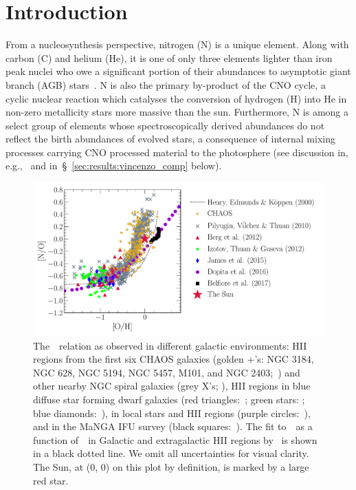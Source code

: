 \documentclass[ms.tex]{subfiles}
\begin{document}
\section{Introduction}
\label{sec:intro}

From a nucleosynthesis perspective, nitrogen (N) is a unique element.
Along with carbon (C) and helium (He), it is one of only three elements lighter
than iron peak nuclei who owe a significant portion of their abundances to
asymptotic giant branch (AGB) stars~\citep{Johnson2019}.
N is also the primary by-product of the CNO cycle, a cyclic nuclear reaction
which catalyses the conversion of hydrogen (H) into He in non-zero metallicity
stars more massive than the sun.
Furthermore, N is among a select group of elements whose spectroscopically
derived abundances do not reflect the birth abundances of evolved stars, a
consequence of internal mixing processes carrying CNO processed material
to the photosphere (see discussion in, e.g.,~\citealp{Vincenzo2021} and
in~\S~\ref{sec:results:vincenzo_comp} below).

\begin{figure}
\centering
\includegraphics[scale = 0.63]{no_oh_observed.pdf}
\caption{
	The~\ohno~relation as observed in different galactic environments:
	HII regions from the first six CHAOS galaxies (golden +'s: NGC 3184, NGC
	628, NGC 5194, NGC 5457, M101, and NGC 2403;~\citealp{Berg2020,
	Skillman2020, Rogers2021}) and other nearby NGC spiral galaxies (grey X's;
	\citealp{Pilyugin2010}), HII regions in blue diffuse star forming dwarf
	galaxies (red triangles:~\citealp{Berg2012}; green stars:
	\citealp{Izotov2012}; blue diamonds:~\citealp{James2015}), in local stars
	and HII regions (purple circles:~\citealp{Dopita2016}), and in the MaNGA
	IFU survey (black squares:~\citealp{Belfiore2017}).
	The fit to~\no~as a function of~\oh~in Galactic and extragalactic HII
	regions by~\citet{Henry2000} is shown in a black dotted line.
	We omit all uncertainties for visual clarity.
	The Sun, at (0, 0) on this plot by definition, is marked by a large red
	star. 
}
\label{fig:no_oh_observed}
\end{figure}
\end{document}
